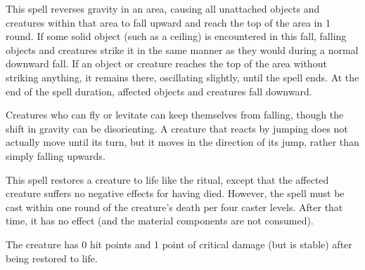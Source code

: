 \begin{spelleffect}
    This spell reverses gravity in an area, causing all unattached objects and creatures within that area to fall upward and reach the top of the area in 1 round. If some solid object (such as a ceiling) is encountered in this fall, falling objects and creatures strike it in the same manner as they would during a normal downward fall. If an object or creature reaches the top of the area without striking anything, it remains there, oscillating slightly, until the spell ends. At the end of the spell duration, affected objects and creatures fall downward.
\end{spelleffect}
\begin{spellnotes}
    Creatures who can fly or levitate can keep themselves from falling, though the shift in gravity can be disorienting. A creature that reacts by jumping does not actually move until its turn, but it moves in the direction of its jump, rather than simply falling upwards.
\end{spellnotes}

\begin{spelleffect}
    This spell restores a creature to life like the  ritual, except that the affected creature suffers no negative effects for having died. However, the spell must be cast within one round of the creature's death per four caster levels. After that time, it has no effect (and the material components are not consumed).

    The creature has 0 hit points and 1 point of critical damage (but is stable) after being restored to life.
\end{spelleffect}

